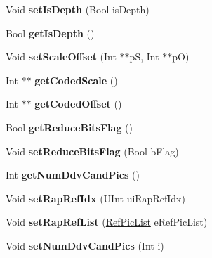 \begin{DoxyCompactItemize}
\mbox{\label{class_t_com_pic_a72f56b92064ecc97de3fa9daaf48babe}} 
Void {\bfseries set\+Is\+Depth} (Bool is\+Depth)
\item 
\mbox{\label{class_t_com_pic_abe892e16b7138778bc3303f3997a9aa6}} 
Bool {\bfseries get\+Is\+Depth} ()
\item 
\mbox{\label{class_t_com_pic_ac06dd6e030251167d92417b748261c1f}} 
Void {\bfseries set\+Scale\+Offset} (Int $\ast$$\ast$pS, Int $\ast$$\ast$pO)
\item 
\mbox{\label{class_t_com_pic_a72f1d1303bd7e83201d9f6571e70e4df}} 
Int $\ast$$\ast$ {\bfseries get\+Coded\+Scale} ()
\item 
\mbox{\label{class_t_com_pic_a91ff635edc4526da50a5bedb30fa9967}} 
Int $\ast$$\ast$ {\bfseries get\+Coded\+Offset} ()
\item 
\mbox{\label{class_t_com_pic_af238851281eeb834ae5cdff2d5e24449}} 
Bool {\bfseries get\+Reduce\+Bits\+Flag} ()
\item 
\mbox{\label{class_t_com_pic_ab1fde469b7e39888b74bcc888118ac58}} 
Void {\bfseries set\+Reduce\+Bits\+Flag} (Bool b\+Flag)
\item 
\mbox{\label{class_t_com_pic_a839f5055c7b3add94ccd352c91a06502}} 
Int {\bfseries get\+Num\+Ddv\+Cand\+Pics} ()
\item 
\mbox{\label{class_t_com_pic_a79bd639b6fd5166b74363d430d985dcc}} 
Void {\bfseries set\+Rap\+Ref\+Idx} (U\+Int ui\+Rap\+Ref\+Idx)
\item 
\mbox{\label{class_t_com_pic_a94bab6f44a92881d49c18413e25f16d7}} 
Void {\bfseries set\+Rap\+Ref\+List} (\hyperlink{_type_def_8h_a93cea48eb9dcfd661168dee82e41b384}{Ref\+Pic\+List} e\+Ref\+Pic\+List)
\item 
\mbox{\label{class_t_com_pic_ab33334e9e777b3e9b29bca62d45fb20c}} 
Void {\bfseries set\+Num\+Ddv\+Cand\+Pics} (Int i)
\item 
\mbox{\label{class_t_com_pic_a83d88910d50024e0146159d5bda1e300}} 

\end{DoxyCompactItemize}
